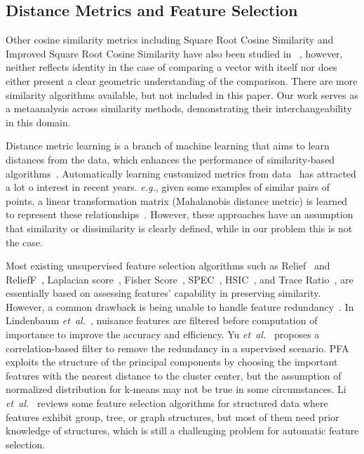 \documentclass[conference]{IEEEtran}
\newcommand{\eg}                {\emph{e.g.},\xspace}
\newcommand{\etal}              {\emph{et~al.}\xspace}
\begin{document}
\subsection{Distance Metrics and Feature Selection}
Other cosine similarity metrics including Square Root Cosine Similarity and Improved Square Root Cosine Similarity have also been studied in ~\cite{sohangir2017improved}, however, neither reflects identity in the case of comparing a vector with itself nor does either present a clear geometric understanding of the comparison. There are more similarity algorithms available, but not included in this paper. Our work serves as a metaanalysis across similarity methods, demonstrating their interchangeability in this domain. 

Distance metric learning is a branch of machine learning that aims to learn distances from
the data, which enhances the performance of similarity-based algorithms~\cite{suarez2021tutorial}. Automatically learning customized metrics from data~\cite{bellet2013survey} has attracted a lot o interest in recent years. \eg given some examples of similar pairs of points, a linear transformation matrix (Mahalanobis distance metric) is learned to represent these relationships~\cite{xing2002distance,weinberger2009distance}. However, these approaches have an assumption that similarity or dissimilarity is clearly defined, while in our problem this is not the case.


Most existing unsupervised feature selection algorithms such as Relief~\cite{kira1992practical} and ReliefF~\cite{kononenko1997overcoming}, Laplacian score~\cite{he2005laplacian}, Fisher Score~\cite{jennrich1976newton}, SPEC~\cite{nguyen2014effective}, HSIC~\cite{yamada2012high}, and Trace Ratio~\cite{nie2008trace}, are essentially based on assessing features' capability in preserving similarity. However, a common drawback is being unable to handle feature redundancy~\cite{zhao2011similarity}. In Lindenbaum \etal~\cite{lindenbaum2021differentiable}, nuisance features are filtered before computation of importance to improve the accuracy and efficiency. Yu \etal~\cite{yu2003feature} proposes a correlation-based filter to remove the redundancy in a supervised scenario.
PFA~\cite{lu2007feature} exploits the structure of the principal components by choosing the important features with the nearest distance to the cluster center, but the assumption of normalized distribution for k-means may not be true in some circumstances. Li \etal~\cite{li2018feature} reviews some feature selection algorithms for structured data where features exhibit group, tree, or graph structures, but most of them need prior knowledge of structures, which is still a challenging problem for automatic feature selection.
\end{document}
